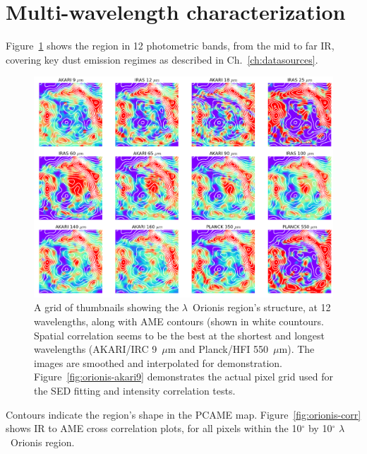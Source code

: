 		\section{Multi-wavelength characterization}
			Figure~\ref{fig:orionis-img} shows the region in 12 photometric bands, from the mid to far IR, covering key dust emission regimes as described in Ch.~\ref{ch:datasources}.
                \begin{figure}
                  \includegraphics[width=\textwidth]{../Plots/lOrionis_grid_img.png}
                  \centering
                  \caption{A grid of thumbnails showing the $\lambda$~Orionis region's structure, at 12 wavelengths, along with AME contours (shown in white countours. Spatial correlation seems to be the best at the shortest and longest wavelengths (AKARI/IRC 9~$\mu$m and Planck/HFI 550~$\mu$m). The images are smoothed and interpolated for demonstration. Figure~\ref{fig:orionis-akari9} demonstrates the actual pixel grid used for the SED fitting and intensity correlation tests.}
                  \label{fig:orionis-img}
                \end{figure}
			Contours indicate the region's shape in the PCAME map. Figure~\ref{fig:orionis-corr} shows IR to AME cross correlation plots, for all pixels within the 10$^{\circ}$ by 10$^{\circ}$ $\lambda$~Orionis region.
